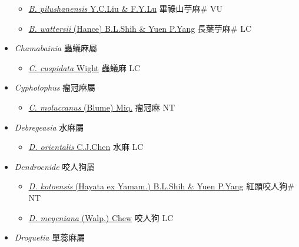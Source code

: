 \begin{itemize}
\begin{itemize}
        \item[] \href{http://www.theplantlist.org/tpl1.1/search?q=Boehmeria+pilushanensis}{\textit{B. pilushanensis} Y.C.Liu \& F.Y.Lu}   畢祿山苧麻\# VU
        \item[] \href{http://www.theplantlist.org/tpl1.1/search?q=Boehmeria+wattersii}{\textit{B. wattersii} (Hance) B.L.Shih \& Yuen P.Yang}   長葉苧麻\# LC
  \end{itemize}
 \item[] \textit{Chamabainia} 蟲蟻麻屬
                    
  \begin{itemize}
        \item[] \href{http://www.theplantlist.org/tpl1.1/search?q=Chamabainia+cuspidata}{\textit{C. cuspidata} Wight}   蟲蟻麻 LC
  \end{itemize}
 \item[] \textit{Cypholophus} 瘤冠麻屬
                    
  \begin{itemize}
        \item[] \href{http://www.theplantlist.org/tpl1.1/search?q=Cypholophus+moluccanus}{\textit{C. moluccanus} (Blume) Miq.}   瘤冠麻 NT
  \end{itemize}
 \item[] \textit{Debregeasia} 水麻屬
                    
  \begin{itemize}
        \item[] \href{http://www.theplantlist.org/tpl1.1/search?q=Debregeasia+orientalis}{\textit{D. orientalis} C.J.Chen}   水麻 LC
  \end{itemize}
 \item[] \textit{Dendrocnide} 咬人狗屬
                    
  \begin{itemize}
        \item[] \href{http://www.theplantlist.org/tpl1.1/search?q=Dendrocnide+kotoensis}{\textit{D. kotoensis} (Hayata ex Yamam.) B.L.Shih \& Yuen P.Yang}   紅頭咬人狗\# NT
        \item[] \href{http://www.theplantlist.org/tpl1.1/search?q=Dendrocnide+meyeniana}{\textit{D. meyeniana} (Walp.) Chew}   咬人狗 LC
  \end{itemize}
 \item[] \textit{Droguetia} 單蕊麻屬
                    

\end{itemize}
